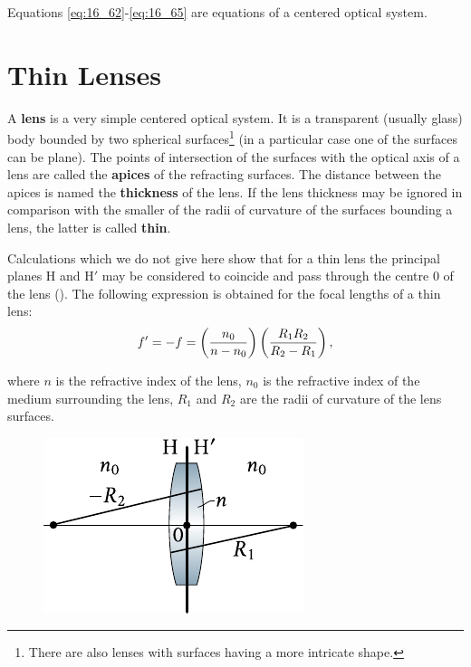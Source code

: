 \noindent
Equations \eqref{eq:16_62}-\eqref{eq:16_65} are equations of a centered optical system.

\section{Thin Lenses}\label{sec:16_8}

A \textbf{lens} is a very simple centered optical system.
It is a transparent (usually glass) body bounded by two spherical surfaces\footnote{There are also lenses with surfaces having a more intricate shape.} (in a particular
case one of the surfaces can be plane).
The points of intersection of the surfaces with the optical axis of a lens are called the \textbf{apices} of the refracting surfaces.
The distance between the apices is named the \textbf{thickness} of the lens.
If the lens thickness may be ignored in comparison with the smaller of the radii of curvature of the surfaces bounding a lens, the latter is called \textbf{thin}.

Calculations which we do not give here show that for a thin lens the principal planes H and H$'$ may be considered to coincide and pass through the centre $0$ of the lens ().
The following expression is obtained for the focal lengths of a thin lens:
\begin{equation}\label{eq:16_66}
    f' = -f = \left(\frac{n_0}{n-n_0}\right) \left(\frac{R_1R_2}{R_2-R_1}\right),
\end{equation}

\noindent
where $n$ is the refractive index of the lens, $n_0$ is the refractive index of the medium surrounding the lens, $R_1$ and $R_2$ are the radii of curvature of the lens surfaces.

\begin{figure}[t]
	\begin{center}
		\includegraphics[scale=1]{figures/ch_16/fig_16_19.pdf}
        \caption[]{}
		\label{fig:16_19}
	\end{center}
	\vspace{-0.8cm}
\end{figure}

